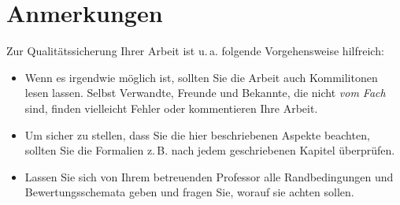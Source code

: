 \documentclass[conference,final,a4paper]{IEEEtran}
\begin{document}
\section{Anmerkungen}
Zur Qualitätssicherung Ihrer Arbeit ist u.\,a. folgende Vorgehensweise hilfreich:
\begin{itemize}
\item Wenn es irgendwie möglich ist, sollten Sie die Arbeit auch Kommilitonen lesen lassen. Selbst Verwandte, Freunde und Bekannte, die nicht \emph{vom Fach} sind, finden vielleicht Fehler oder kommentieren Ihre Arbeit.
\item Um sicher zu stellen, dass Sie die hier beschriebenen Aspekte beachten, sollten Sie die Formalien z.\,B. nach jedem geschriebenen Kapitel überprüfen.
\item Lassen Sie sich von Ihrem betreuenden Professor alle Randbedingungen und Bewertungsschemata geben und fragen Sie, worauf sie achten sollen. 
\end{itemize}



%
%

\end{document}
